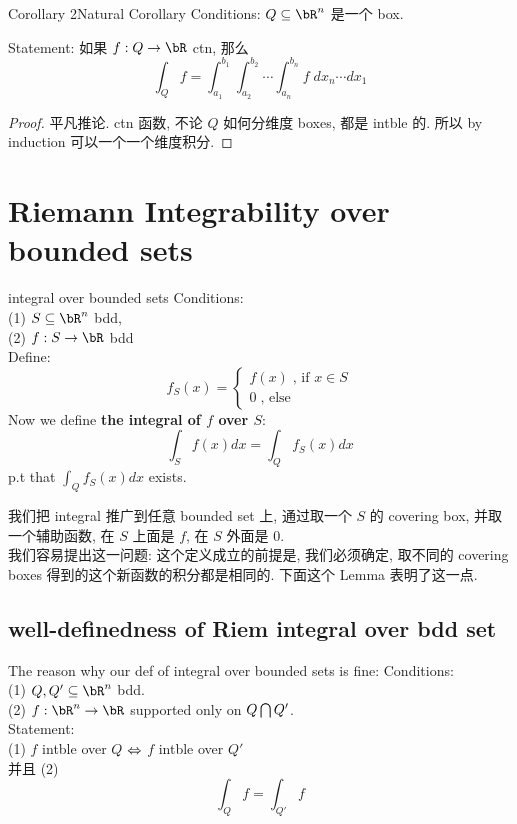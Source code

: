 \documentclass[lang=cn,11pt]{elegantbook}
\begin{document}
\begin{corollary}{Corollary 2}{Natural Corollary}
Conditions: $Q \subseteq \bR ^ n$ 是一个 box.

Statement: 如果 $f: Q \rightarrow \bR$ ctn, 那么
$$
\int_Q f = \int^{b_1}_{a_1} \int^{b_2}_{a_2} \cdots \int^{b_n}_{a_n} f \; d x_n \cdots d x_1
$$
\end{corollary}

\begin{proof}
    平凡推论. ctn 函数, 不论 $Q$ 如何分维度 boxes, 都是 intble 的. 所以 by induction 可以一个一个维度积分.
\end{proof}






\section{Riemann Integrability over bounded sets}

\begin{definition}{integral over bounded sets}
    Conditions:\\
    (1) $S \sub \bR^n$ bdd, \\
    (2) $f: S \rightarrow \bR$ bdd\\
    Define: 
    $$
    f_S (x) = \begin{cases}
        f(x) \; \text{, if } x \in S \\
        0 \; \text{, else}
    \end{cases}
   $$
   Now we define \textbf{the integral of $f$ over $S$}: 
   $$
   \int_S f(x) dx = \int_Q f_S (x) dx
   $$
   p.t that $\int_Q f_S (x) dx$ exists.
\end{definition}
\begin{remark}
    我们把 integral 推广到任意 bounded set 上, 通过取一个 $S$ 的 covering box, 并取一个辅助函数, 在 $S$ 上面是 $f$, 在 $S$ 外面是 $0$.\\
    我们容易提出这一问题: 这个定义成立的前提是, 我们必须确定, 取不同的 covering boxes 得到的这个新函数的积分都是相同的. 下面这个 Lemma 表明了这一点. 
\end{remark}

\subsection{well-definedness of Riem integral over bdd set}
\begin{lemma}{The reason why our def of integral over bounded sets is fine:}
    Conditions:\\
    (1) $Q, Q' \sub \bR^n$ bdd.\\
    (2) $f: \bR^n \rar \bR$ supported only on $Q \bigcap Q'$.\\
    Statement:\\
    (1) $f$ intble over $Q$ $\Leftrightarrow$ $f$ intble over $Q'$ \\
    并且 (2)
    $$
    \int_Q f = \int_{Q'} f 
    $$
\end{lemma}
\end{document}
